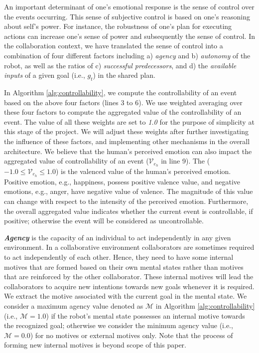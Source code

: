 \documentclass{article}
\begin{document}
An important determinant of one's emotional response is the sense of control
over the events occurring. This sense of subjective control is based on one's
reasoning about self's power. For instance, the robustness of one's plan for
executing actions can increase one's sense of power and subsequently the sense
of control. In the collaboration context, we have translated the sense of control
into a combination of four different factors including a) \textit{agency} and b)
\textit{autonomy} of the robot, as well as the ratios of c) \textit{successful
predecessors}, and d) the \textit{available inputs} of a given goal
(i.e., $\mathit{g}_{t}$) in the shared plan.

In Algorithm \ref{alg:controllability}, we compute the controllability of an
event based on the above four factors (lines 3 to 6). We use weighted averaging
over these four factors to compute the aggregated value of the controllability of an
event. The value of all these weights are set to \textit{1.0} for the purpose of
simplicity at this stage of the project. We will adjust these weights after
further investigating the influence of these factors, and implementing other
mechanisms in the overall architecture. We believe that the human's perceived
emotion can also impact the aggregated value of controllability of an event
($\mathcal{V}_{e_h}$ in line 9). The ($-1.0 \leq \mathcal{V}_{e_h} \leq 1.0$) is
the valenced value of the human's perceived emotion. Positive emotion, e.g.,
happiness, possess positive valence value, and negative emotions, e.g.,
anger, have negative value of valence. The magnitude of this value can change
with respect to the intensity of the perceived emotion. Furthermore, the overall
aggregated value indicates whether the current event is controllable, if
positive; otherwise the event will be considered as uncontrollable.

\textit{\textbf{Agency}} is the capacity of an individual to act independently
in any given environment. In a collaborative environment collaborators are
sometimes required to act independently of each other. Hence, they need to have
some internal motives that are formed based on their own mental states rather
than motives that are reinforced by the other collaborator. These internal
motives will lead the collaborators to acquire new intentions towards new goals
whenever it is required. We extract the motive associated with the current goal
in the mental state. We consider a maximum agency value denoted as $\mathcal{M}$
in Algorithm \ref{alg:controllability} (i.e., $\mathcal{M}=1.0$) if the
robot's mental state possesses an internal motive towards the recognized goal;
otherwise we consider the minimum agency value (i.e., $\mathcal{M}=0.0$) for no
motives or external motives only. Note that the process of forming new internal
motives is beyond scope of this paper.
\end{document}
